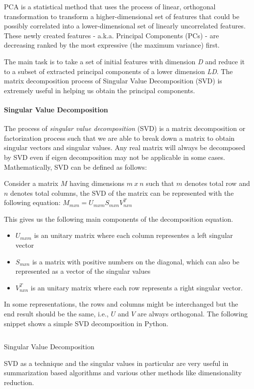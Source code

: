PCA is a statistical method that uses the process of linear, orthogonal
transformation to transform a higher-dimensional set of features that
could be possibly correlated into a lower-dimensional set of linearly
uncorrelated features. These newly created features - a.k.a. Principal
Components (PCs) - are decreasing ranked by the most expressive (the
maximum variance) first.

The main task is to take a set of initial features with dimension
\emph{D} and reduce it to a subset of extracted principal components of
a lower dimension \emph{LD}. The matrix decomposition process of
Singular Value Decomposition (SVD) is extremely useful in helping us
obtain the principal components.

\hypertarget{singular-value-decomposition}{%
\paragraph{Singular Value
Decomposition}\label{singular-value-decomposition}}

The process of \emph{singular value decomposition} (SVD) is a matrix
decomposition or factorization process such that we are able to break
down a matrix to obtain singular vectors and singular values. Any real
matrix will always be decomposed by SVD even if eigen decomposition may
not be applicable in some cases. Mathematically, SVD can be defined as
follows:

Consider a matrix \(M\) having dimensions \(m\ x\ n\) such that \(m\)
denotes total row and \(n\) denotes total columns, the SVD of the matrix
can be represented with the following equation:
\(M_{mxn} = U_{mxm}S_{mxn}V^{T}_{nxn}\)

This gives us the following main components of the decomposition
equation.

\begin{itemize}
\item
  \(U_{mxm}\) is an unitary matrix where each column representes a left
  singular vector
\item
  \(S_{mxn}\) is a matrix with positive numbers on the diagonal, which
  can also be represented as a vector of the singular values
\item
  \(V^{T}_{nxn}\) is an unitary matrix where each row represents a right
  singular vector.
\end{itemize}

In some representations, the rows and columns might be interchanged but
the end result should be the same, i.e., \(U\) and \(V\) are always
orthogonal. The following snippet shows a simple SVD decomposition in
Python.

\begin{listing}[H]
  \inputminted{python}{code/svd.py}
  \caption{Singular Value Decomposition}
  \label{lst:SVD}
\end{listing}

SVD as a technique and the singular values in particular are very useful
in summarization based algorithms and various other methods like
dimensionality reduction.
